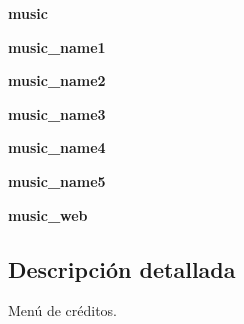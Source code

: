\begin{DoxyCompactItemize}
\item 
\hypertarget{classengine_1_1mainmenu_1_1CreditsMenu_a8e25ae71b8ff74855a51d2b38e90429b}{
{\bfseries music}}
\label{classengine_1_1mainmenu_1_1CreditsMenu_a8e25ae71b8ff74855a51d2b38e90429b}

\item 
\hypertarget{classengine_1_1mainmenu_1_1CreditsMenu_a391efbcbb2f50209d21af9e93946cf52}{
{\bfseries music\-\_\-name1}}
\label{classengine_1_1mainmenu_1_1CreditsMenu_a391efbcbb2f50209d21af9e93946cf52}

\item 
\hypertarget{classengine_1_1mainmenu_1_1CreditsMenu_acd2e491d5e2c9dfc414057f3a069c7dd}{
{\bfseries music\-\_\-name2}}
\label{classengine_1_1mainmenu_1_1CreditsMenu_acd2e491d5e2c9dfc414057f3a069c7dd}

\item 
\hypertarget{classengine_1_1mainmenu_1_1CreditsMenu_a7d520e3414e5ea93d8319f8107694df9}{
{\bfseries music\-\_\-name3}}
\label{classengine_1_1mainmenu_1_1CreditsMenu_a7d520e3414e5ea93d8319f8107694df9}

\item 
\hypertarget{classengine_1_1mainmenu_1_1CreditsMenu_a25276277283160a0d105e11326b6566e}{
{\bfseries music\-\_\-name4}}
\label{classengine_1_1mainmenu_1_1CreditsMenu_a25276277283160a0d105e11326b6566e}

\item 
\hypertarget{classengine_1_1mainmenu_1_1CreditsMenu_a14c02c0df7e3ffe8f4a4dba16b9ede96}{
{\bfseries music\-\_\-name5}}
\label{classengine_1_1mainmenu_1_1CreditsMenu_a14c02c0df7e3ffe8f4a4dba16b9ede96}

\item 
\hypertarget{classengine_1_1mainmenu_1_1CreditsMenu_a805d4e133116e03871d4ca35f4e661f1}{
{\bfseries music\-\_\-web}}
\label{classengine_1_1mainmenu_1_1CreditsMenu_a805d4e133116e03871d4ca35f4e661f1}

\end{DoxyCompactItemize}


\subsection{\-Descripción detallada}
\-Menú de créditos. 

